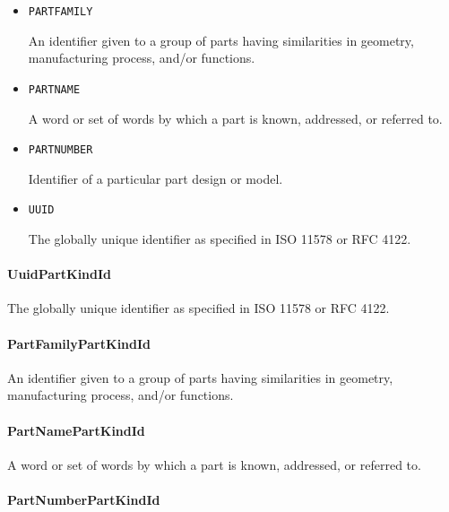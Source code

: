 \begin{itemize}

\item \texttt{PART\textunderscore FAMILY}


An identifier given to a group of parts having similarities in geometry, manufacturing process, and/or functions.

\item \texttt{PART\textunderscore NAME}


A word or set of words by which a part is known, addressed, or referred to.

\item \texttt{PART\textunderscore NUMBER}


Identifier of a particular part design or model.

\item \texttt{UUID}


The globally unique identifier as specified in ISO 11578 or RFC 4122.


\end{itemize}

\paragraph{UuidPartKindId}\mbox{}
\label{sec:UuidPartKindId}


The globally unique identifier as specified in ISO 11578 or RFC 4122.


\paragraph{PartFamilyPartKindId}\mbox{}
\label{sec:PartFamilyPartKindId}


An identifier given to a group of parts having similarities in geometry, manufacturing process, and/or functions.


\paragraph{PartNamePartKindId}\mbox{}
\label{sec:PartNamePartKindId}


A word or set of words by which a part is known, addressed, or referred to.


\paragraph{PartNumberPartKindId}\mbox{}
\label{sec:PartNumberPartKindId}


